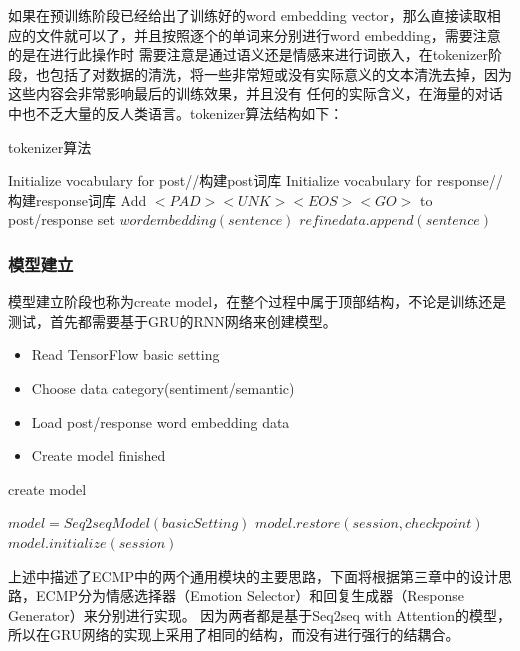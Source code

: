 \documentclass[supercite]{HustGraduPaper}
\theoremstyle{definition}
\begin{document}
如果在预训练阶段已经给出了训练好的word embedding vector，那么直接读取相应的文件就可以了，并且按照逐个的单词来分别进行word embedding，需要注意的是在进行此操作时
需要注意是通过语义还是情感来进行词嵌入，在tokenizer阶段，也包括了对数据的清洗，将一些非常短或没有实际意义的文本清洗去掉，因为这些内容会非常影响最后的训练效果，并且没有
任何的实际含义，在海量的对话中也不乏大量的反人类语言。tokenizer算法结构如下：
\begin{algorithm}
  \caption{tokenizer算法}
  \label{alg:tok}
  \begin{algorithmic}
      \State Initialize vocabulary for post//构建post词库
      \State Initialize vocabulary for response//构建response词库
      \State Add $<PAD> <UNK> <EOS> <GO> $ to post/response set
    \EndFor
        \State $wordembedding(sentence)$
        \State $refinedata.append(sentence)$
    \EndFor
  \end{algorithmic}
\end{algorithm}

\subsubsection{模型建立}
模型建立阶段也称为create model，在整个过程中属于顶部结构，不论是训练还是测试，首先都需要基于GRU的RNN网络来创建模型。
\begin{itemize}
  \item Read TensorFlow basic setting
  \item Choose data category(sentiment/semantic)
  \item Load post/response word embedding data
  \item Create model finished
\end{itemize}
\begin{algorithm}
  \caption{create model}
  \label{alg:crm}
  \begin{algorithmic}
    \State $model = Seq2seqModel(basic Setting)$
      \State $model.restore(session,checkpoint)$
    \Else \State $model.initialize(session)$
    \EndIf
  \end{algorithmic}
\end{algorithm}


上述中描述了ECMP中的两个通用模块的主要思路，下面将根据第三章中的设计思路，ECMP分为情感选择器（Emotion Selector）和回复生成器（Response Generator）来分别进行实现。
因为两者都是基于Seq2seq with Attention的模型，所以在GRU网络的实现上采用了相同的结构，而没有进行强行的结耦合。
\end{document}
